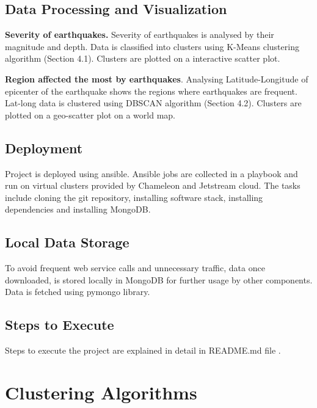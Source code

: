 \documentclass[9pt,twocolumn,twoside]{../../styles/osajnl}
\begin{document}
\subsection{Data Processing and Visualization}

{\bfseries Severity of earthquakes.} Severity of earthquakes is analysed by their magnitude and depth. Data is classified into clusters using K-Means clustering algorithm (Section 4.1). Clusters are plotted on a interactive scatter plot.

{\bfseries Region affected the most by earthquakes}. Analysing Latitude-Longitude of epicenter of the earthquake shows the regions where earthquakes are frequent. Lat-long data is clustered using DBSCAN algorithm (Section 4.2). Clusters are plotted on a geo-scatter plot on a world map.

\subsection{Deployment}

Project is deployed using ansible. Ansible jobs are collected in a playbook and run on virtual clusters provided by Chameleon and Jetstream cloud. The tasks include cloning the git repository, installing software stack, installing dependencies and installing MongoDB.

\subsection{Local Data Storage}
To avoid frequent web service calls and unnecessary traffic, data once downloaded, is stored locally in MongoDB for further usage by other components. Data is fetched using pymongo library. 

\subsection{Steps to Execute}

Steps to execute the project are explained in detail in README.md file \cite{readme-001}.

\section{Clustering Algorithms}
\end{document}
